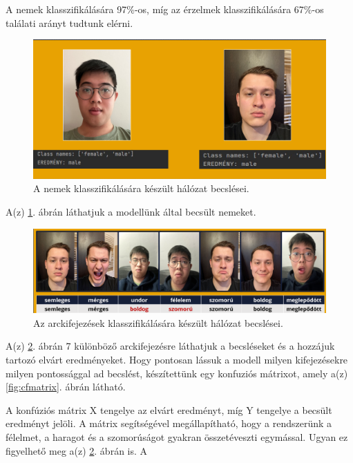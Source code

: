 \documentclass[12pt,a4]{article}
\begin{document}
            A nemek klasszifikálására 97\%-os, míg az érzelmek klasszifikálására 67\%-os találati arányt tudtunk elérni.
    
                \begin{figure}[h!]	
            		\centering
            		\includegraphics[width=1\linewidth]{gender}
                    \caption{  A nemek klasszifikálására készült hálózat becslései.}
                    \label{fig:gender}
            	\end{figure}
            
                A(z) \ref{fig:gender}. ábrán láthatjuk a modellünk által becsült nemeket.
            
                \begin{figure}[h!]	
            		\centering
            		\includegraphics[width=1\linewidth]{arcanalizis}
                    \caption{  Az arckifejezések klasszifikálására készült hálózat becslései.}
                    \label{fig:expr}
            	\end{figure}
            
                A(z) \ref{fig:expr}. ábrán 7 különböző arckifejezésre láthatjuk a becsléseket és a hozzájuk tartozó elvárt eredményeket. Hogy pontosan lássuk a modell milyen kifejezésekre milyen pontossággal ad becslést, készítettünk egy konfuziós mátrixot, amely a(z) \ref{fig:cfmatrix}. ábrán látható.

                A konfúziós mátrix X tengelye az elvárt eredményt, míg Y tengelye a becsült eredményt jelöli.
                A mátrix segítségével megállapítható, hogy a rendszerünk a félelmet, a haragot és a szomorúságot gyakran összetéveszti egymással. Ugyan ez figyelhető meg a(z) \ref{fig:expr}. ábrán is. A 
                
\end{document}
